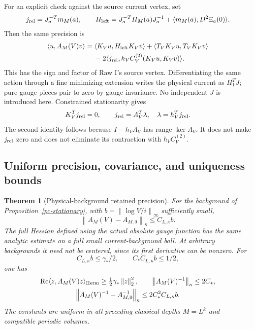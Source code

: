 \documentclass[11pt]{article}
\newtheorem{theorem}{Theorem}[section]
\theoremstyle{remark}
\newcommand{\norm}[1]{\left\|#1\right\|}
\begin{document}
For an explicit check against the source current vertex, set
\[
 j_{\rm rel}=J_a^{-T}m_M(a),\qquad
 H_{\rm left}=J_a^{-T}H_M(a)J_a^{-1}
                     +\langle m_M(a),D^2\Xi_a(0)\rangle.
\]
Then the same precision is
\begin{equation}\label{pc-source-current-form}
 \begin{split}
 \langle u,A_M(V)v\rangle={}&
 \langle K_Vu,H_{\rm left}K_Vv\rangle
 +\langle T_VK_Vu,T_VK_Vv\rangle\\
 &-2\langle j_{\rm rel},h_VC_V^{(2)}(K_Vu,K_Vv)\rangle.
 \end{split}
\end{equation}
This has the sign and factor of Raw I's source vertex.
Differentiating the same action through a fine minimizing
extension writes the physical current as $H_1^TJ$; pure gauge
pieces pair to zero by gauge invariance. No independent $J$
is introduced here. Constrained stationarity gives
\begin{equation}\label{pc-current-stationarity}
 K_V^Tj_{\rm rel}=0,\qquad
 j_{\rm rel}=A_V^T\lambda,\quad \lambda=h_V^Tj_{\rm rel}.
\end{equation}
The second identity follows because $I-h_VA_V$ has range
$\ker A_V$. It does not make $j_{\rm rel}$ zero and does
not eliminate its contraction with $h_VC_V^{(2)}$.

\subsection{Uniform precision, covariance, and uniqueness bounds}
\label{pc-bounds-section}

\begin{theorem}[Physical-background retained precision]
\label{pc-precision-theorem}
For the background of Proposition~\ref{pc-stationary}, with
$b=\norm{\log V/i}_\infty$ sufficiently small,
\begin{equation}\label{pc-precision-perturbation}
 \norm{A_M(V)-A_{M,0}}_\kappa\le C_{L,\kappa}b.
\end{equation}
The full Hessian defined using the actual absolute gauge
function has the same analytic estimate on a full small
current-background ball. At arbitrary backgrounds it need
not be centered, since its first derivative can be nonzero.
For
\begin{equation}\label{pc-radius}
 C_{L,\kappa}b\le\gamma_*/2,\qquad
 C_*C_{L,\kappa}b\le1/2,
\end{equation}
one has
\begin{equation}\label{pc-inverse-bounds}
 \begin{gathered}
 \operatorname{Re}\langle z,A_M(V)z\rangle_{\rm Herm}
       \ge\tfrac12\gamma_*\norm z_2^2,\qquad
 \norm{A_M(V)^{-1}}_\kappa\le2C_*,\\
 \norm{A_M(V)^{-1}-A_{M,0}^{-1}}_\kappa
       \le2C_*^2C_{L,\kappa}b.
 \end{gathered}
\end{equation}
The constants are uniform in all preceding classical depths
$M=L^k$ and compatible periodic volumes.
\end{theorem}
\end{document}
